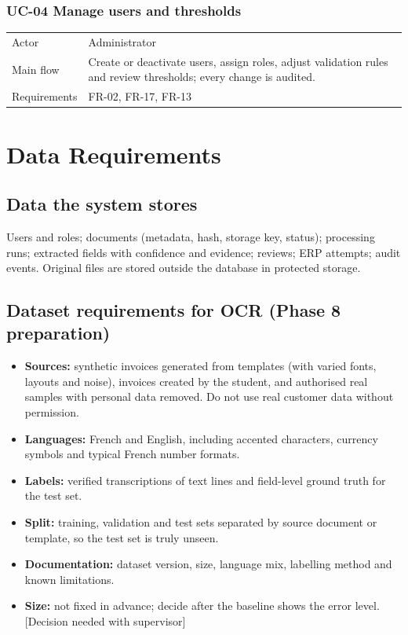 \subsection*{UC-04 Manage users and thresholds}
{\tblstart\small
\begin{longtable}{L{3.0cm}L{10.8cm}}
Actor & Administrator\\
Main flow & Create or deactivate users, assign roles, adjust validation rules and review thresholds; every change is audited.\\
Requirements & FR-02, FR-17, FR-13\\
\hline
\end{longtable}}

\chapter{Data Requirements}
\section{Data the system stores}
Users and roles; documents (metadata, hash, storage key, status); processing runs; extracted fields with confidence and evidence; reviews; ERP attempts; audit events. Original files are stored outside the database in protected storage.

\section{Dataset requirements for OCR (Phase 8 preparation)}
\begin{itemize}
\item \textbf{Sources:} synthetic invoices generated from templates (with varied fonts, layouts and noise), invoices created by the student, and authorised real samples with personal data removed. Do not use real customer data without permission.
\item \textbf{Languages:} French and English, including accented characters, currency symbols and typical French number formats.
\item \textbf{Labels:} verified transcriptions of text lines and field-level ground truth for the test set.
\item \textbf{Split:} training, validation and test sets separated by source document or template, so the test set is truly unseen.
\item \textbf{Documentation:} dataset version, size, language mix, labelling method and known limitations.
\item \textbf{Size:} not fixed in advance; decide after the baseline shows the error level. [Decision needed with supervisor]
\end{itemize}

